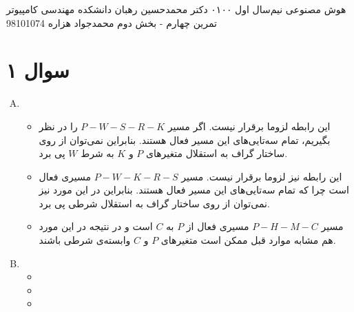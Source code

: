 \documentclass[a4paper, 12pt]{article}
\begin{document}
	\handout
	{هوش مصنوعی}
	{نیم‌سال اول ۰۱\lr{-}۰۰}
	{دکتر محمدحسین رهبان}
	{دانشکده مهندسی کامپیوتر}
	{تمرین چهارم - بخش دوم}
	{محمدجواد هزاره}
	{98101074}
	\noindent
	\\[-6em]
	\section*{سوال ۱}
	\begin{enumerate}[A)]
		\item
		\begin{itemize}
			\item
			این رابطه لزوما برقرار نیست. اگر مسیر
			$P-W-S-R-K$
			را در نظر بگیریم، تمام سه‌تایی‌های این مسیر فعال هستند. بنابراین نمی‌توان از روی ساختار گراف به استقلال متغیرهای $P$ و $K$ به شرط $W$ پی برد.
			\item
			این رابطه نیز لزوما برقرار نیست. مسیر
			$P-W-K-R-S$
			مسیری فعال است چرا که تمام سه‌تایی‌های این مسیر فعال هستند. بنابراین در این مورد نیز نمی‌توان از روی ساختار گراف به استقلال شرطی پی برد.
			\item
			مسیر
			$P-H-M-C$
			مسیری فعال از $P$ به $C$ است و در نتیجه در این مورد هم مشابه موارد قبل ممکن است متغیرهای $P$ و $C$ وابسته‌ی شرطی باشند.
		\end{itemize}
		\item
		\begin{itemize}
			\item
			\item
			\item
		\end{itemize}
	\end{enumerate}
\end{document}
